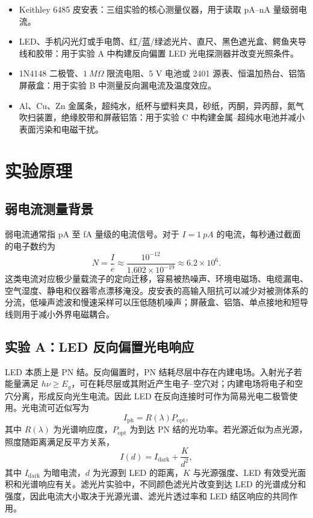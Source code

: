 \documentclass[11pt]{article}
\begin{document}
\begin{itemize}
    \item Keithley 6485 皮安表：三组实验的核心测量仪器，用于读取 pA--nA 量级弱电流。
    \item LED、手机闪光灯或手电筒、红/蓝/绿滤光片、直尺、黑色遮光盒、鳄鱼夹导线和胶带：用于实验 A 中构建反向偏置 LED 光电探测器并改变光照条件。
    \item 1N4148 二极管、$\SI{1}{M\Omega}$ 限流电阻、5 V 电池或 2401 源表、恒温加热台、铝箔屏蔽盒：用于实验 B 中测量反向漏电流及温度效应。
    \item Al、Cu、Zn 金属条，超纯水，纸杯与塑料夹具，砂纸，丙酮，异丙醇，氮气吹扫装置，绝缘胶带和屏蔽铝箔：用于实验 C 中构建金属--超纯水电池并减小表面污染和电磁干扰。
\end{itemize}

\section{实验原理}

\subsection{弱电流测量背景}

弱电流通常指 pA 至 fA 量级的电流信号。对于 $I=\SI{1}{pA}$ 的电流，每秒通过截面的电子数约为
\begin{equation}
    N=\frac{I}{e}\approx \frac{10^{-12}}{1.602\times10^{-19}}\approx 6.2\times10^6 .
\end{equation}
这类电流对应极少量载流子的定向迁移，容易被热噪声、环境电磁场、电缆漏电、空气湿度、静电和仪器零点漂移淹没。皮安表的高输入阻抗可以减少对被测体系的分流，低噪声滤波和慢速采样可以压低随机噪声；屏蔽盒、铝箔、单点接地和短导线则用于减小外界电磁耦合。

\subsection{实验 A：LED 反向偏置光电响应}

LED 本质上是 PN 结。反向偏置时，PN 结耗尽层中存在内建电场。入射光子若能量满足 $h\nu \geq E_g$，可在耗尽层或其附近产生电子--空穴对；内建电场将电子和空穴分离，形成反向光生电流。因此 LED 在反向连接时可作为简易光电二极管使用。光电流可近似写为
\begin{equation}
    I_{\mathrm{ph}}=R(\lambda)P_{\mathrm{opt}},
\end{equation}
其中 $R(\lambda)$ 为光谱响应度，$P_{\mathrm{opt}}$ 为到达 PN 结的光功率。若光源近似为点光源，照度随距离满足反平方关系，
\begin{equation}
    I(d)=I_{\mathrm{dark}}+\frac{K}{d^2},
\end{equation}
其中 $I_{\mathrm{dark}}$ 为暗电流，$d$ 为光源到 LED 的距离，$K$ 与光源强度、LED 有效受光面积和光谱响应有关。滤光片实验中，不同颜色滤光片改变到达 LED 的光谱成分和强度，因此电流大小取决于光源光谱、滤光片透过率和 LED 结区响应的共同作用。
\end{document}
